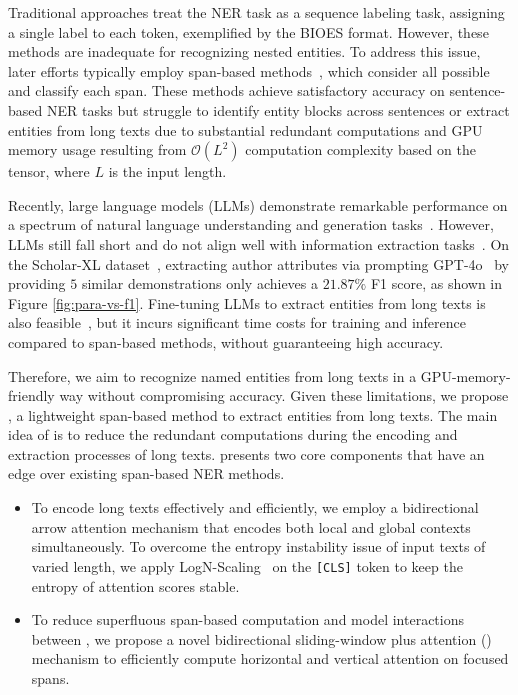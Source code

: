 Traditional approaches treat the NER task as a sequence labeling task, assigning a single label to each token, exemplified by the BIOES format.
However, these methods are inadequate for recognizing nested entities. 
To address this issue, later efforts typically employ span-based methods~\cite{su2022global,yan-etal-2023-utc}, which consider all possible \tokenspans and classify each span.
These methods achieve satisfactory accuracy on sentence-based NER tasks
but struggle to identify entity blocks across sentences or extract entities from long texts
due to substantial redundant computations and GPU memory usage resulting from $\mathcal{O}(L^2)$ computation complexity based on the \tokenspan tensor,
where $L$ is the input length.

Recently, large language models (LLMs) demonstrate remarkable performance on a spectrum of natural language understanding and generation tasks~\cite{zhao2023survey}.
However, LLMs still fall short and do not align well with information extraction tasks~\cite{qi2024adelie}.
On the Scholar-XL dataset~\cite{zhang2024oag},
extracting author attributes via prompting GPT-4o~\cite{achiam2023gpt} by providing $5$ similar demonstrations only achieves a $21.87\%$ F1 score, as shown in Figure \ref{fig:para-vs-f1}.
Fine-tuning LLMs to extract entities from long texts is also feasible~\cite{sainz2023gollie,qi2024adelie}, but it incurs significant time costs for training and inference compared to span-based methods, without guaranteeing high accuracy.

Therefore, we aim to recognize named entities from long texts in a GPU-memory-friendly way without compromising accuracy.
Given these limitations, 
we propose \model,
a lightweight span-based method to extract entities from long texts.
The main idea of \model is to reduce the redundant computations during the encoding and extraction processes of long texts.
\model presents two core components that have an edge over existing span-based NER methods.


\begin{itemize}
    \item To encode long texts effectively and efficiently,
    we employ a bidirectional arrow attention mechanism that encodes both local and global contexts simultaneously.
    To overcome the entropy instability issue of input texts of varied length, we apply 
    LogN-Scaling~\cite{su2021logn} on the \texttt{[CLS]} token to keep the entropy of attention scores stable.
    \item To reduce superfluous span-based computation and model interactions between \tokenspans, we propose a novel bidirectional sliding-window plus attention (\biswa) mechanism to efficiently compute horizontal and vertical attention on focused spans.
\end{itemize}

